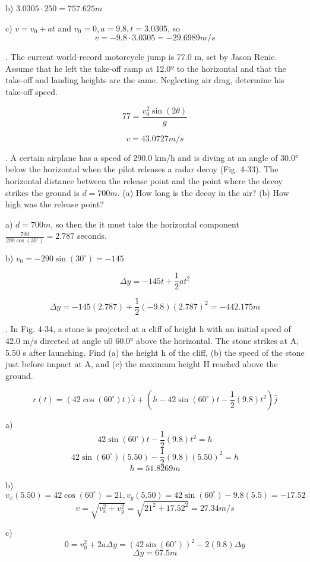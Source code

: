 \documentclass{scrreprt} %
\begin{document}
b) $3.0305\cdot 250 = \boxed{757.625 m}$

c) $v = v_0 + at$ and $v_0 = 0, a = 9.8, t = 3.0305$, so $$v = -9.8\cdot 3.0305 = \boxed{-29.6989 m/s}$$

. The current world-record motorcycle jump is 77.0 m,
set  by  Jason  Renie. Assume  that he  left  the  take-off  ramp  at  
12.0º to the horizontal and that the take-off and landing 
heights are the same. Neglecting air drag, determine his take-off
speed.

$$77=\frac{v_0^2\sin(2\theta)}{g}$$

$$\boxed{v = 43.0727 m/s}$$

. A certain airplane has a
speed  of  290.0 km/h  and  is  diving
at  an  angle  of 30.0° below  the
horizontal  when  the pilot  releases
a radar decoy (Fig. 4-33). The horizontal distance between the 
release  point  and  the  point  where
the decoy strikes the ground is $d =
700 m$. (a) How long is the decoy in
the  air?  (b) How high was the release point?

a) $d = 700m$, so then the it must take the horizontal component
$\frac{700}{290\cos(30^\circ)}=\boxed{2.787}$ seconds.

b) $v_0 = -290\sin(30^\circ) = -145$

$$\Delta y = -145t + \frac{1}{2}at^2$$

$$\Delta y = -145(2.787) + \frac{1}{2}(-9.8)(2.787)^2 = \boxed{-442.175 m}$$

. In Fig. 4-34, a stone is projected at a cliff of height h with an initial speed of 42.0 m/s directed
at  angle  u0 60.0° above  the  horizontal. The  stone  strikes  at  A,
5.50 s  after  launching. Find  (a)  the  height  h of  the  cliff, (b)  the
speed of the stone just before impact at A, and (c) the maximum
height H reached above the ground.

$$r(t) = (42\cos(60^\circ)t)\hat{i} + (h - 42\sin(60^\circ)t - \frac{1}{2}(9.8)t^2)\hat{j}$$

a)  $$42\sin(60^\circ)t - \frac{1}{2}(9.8)t^2 = h$$
	$$42\sin(60^\circ)(5.50) - \frac{1}{2}(9.8)(5.50)^2 = h$$
	$$\boxed{h = 51.8269 m}$$

b) 	$$v_x(5.50) = 42\cos(60^\circ) = 21, v_y(5.50) = 42\sin(60^\circ) - 9.8(5.5) = -17.52$$
	$$v = \sqrt{v_x^2 + v_y^2} = \sqrt{21^2 + 17.52^2} = \boxed{27.34 m/s}$$

c) 	$$0 = v_0^2 + 2a\Delta y = (42\sin(60^\circ))^2 - 2(9.8)\Delta y$$
	$$\boxed{\Delta y = 67.5m}$$
\end{document}
